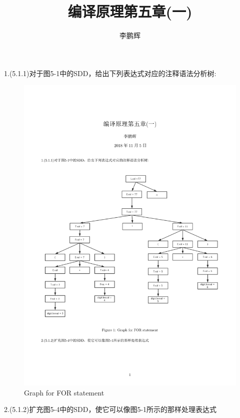 \documentclass[a4paper, 10pt]{article}
\title{编译原理第五章(一)}
\author{李鹏辉}
\begin{document}
\maketitle 

1.(5.1.1)对于图5-1中的SDD，给出下列表达式对应的注释语法分析树:
\begin{figure}[H]
\centering
\includegraphics[scale=0.5]{chapter5_hw1}
\caption{Graph for FOR statement}
\end{figure}

2.(5.1.2)扩充图5-4中的SDD，使它可以像图5-1所示的那样处理表达式\\
\end{document}
